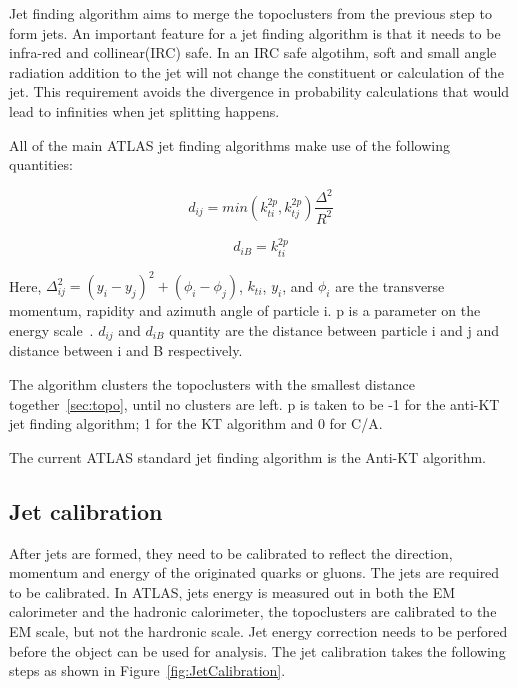 Jet finding algorithm aims to merge the topoclusters from the previous step to form jets. An important feature for a jet finding algorithm is that it needs to be infra-red and collinear(IRC) safe. In an IRC safe algotihm, soft and small angle radiation addition to the jet will not change the constituent or calculation of the jet. This requirement avoids the divergence in probability calculations that would lead to infinities when jet splitting happens.

All of the main ATLAS jet finding algorithms make use of the following quantities:

\begin{equation}
    d_{ij} = min(k_{ti}^{2p}, k_{tj}^{2p}) \frac{\Delta^{2}}{R^{2}}
    \label{sec:topo}
\end{equation}

\begin{equation}
    d_{iB} = k^{2p}_{ti}
\end{equation}

Here, $\Delta_{ij}^{2} = (y_{i}- y_{j})^2 + (\phi_{i} - \phi_{j})$, $k_{ti}
$, $y_{i}$, and $\phi_{i}$ are the transverse momentum, rapidity and azimuth angle of particle i. p is a parameter on the energy scale~\cite{HEP2008}. $d_{ij}$ and $d_{iB}$ quantity are the distance between particle i and j and distance between i and B respectively. 

The algorithm clusters the topoclusters with the smallest distance together~\ref{sec:topo}, until no clusters are left. p is taken to be -1 for the anti-KT jet finding algorithm; 1 for the KT algorithm and 0 for C/A. 

The current ATLAS standard jet finding algorithm is the Anti-KT algorithm.

\subsection{Jet calibration}
After jets are formed, they need to be calibrated to reflect the direction, momentum and energy of the originated quarks or gluons. The jets are required to be calibrated. In ATLAS, jets energy is measured out in both the EM calorimeter and the hadronic calorimeter, the topoclusters are calibrated to the EM scale, but not the hardronic scale. Jet energy correction needs to be perfored before the object can be used for analysis. The jet calibration takes the following steps as
shown in Figure~\ref{fig:JetCalibration}.

